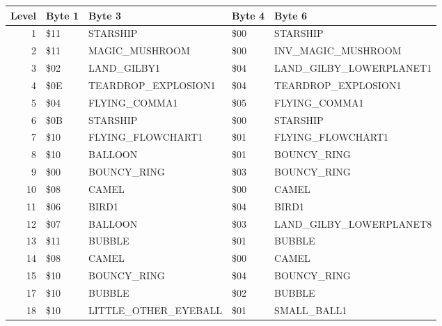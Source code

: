 \begin{figure}[H]
  {
  \setlength{\tabcolsep}{3.0pt}
  \setlength\cmidrulewidth{\heavyrulewidth} %
  \begin{adjustbox}{width=\textwidth}

\begin{tabular}{rllll}
\toprule
   Level & Byte 1    & Byte 3               & Byte 4    & Byte 6                  \\
\midrule
       1 & \$11       & STARSHIP             & \$00       & STARSHIP                \\
       2 & \$11       & MAGIC\_MUSHROOM       & \$00       & INV\_MAGIC\_MUSHROOM      \\
       3 & \$02       & LAND\_GILBY1          & \$04       & LAND\_GILBY\_LOWERPLANET1 \\
       4 & \$0E       & TEARDROP\_EXPLOSION1  & \$04       & TEARDROP\_EXPLOSION1     \\
       5 & \$04       & FLYING\_COMMA1        & \$05       & FLYING\_COMMA1           \\
       6 & \$0B       & STARSHIP             & \$00       & STARSHIP                \\
       7 & \$10       & FLYING\_FLOWCHART1    & \$01       & FLYING\_FLOWCHART1       \\
       8 & \$10       & BALLOON              & \$01       & BOUNCY\_RING             \\
       9 & \$00       & BOUNCY\_RING          & \$03       & BOUNCY\_RING             \\
      10 & \$08       & CAMEL                & \$00       & CAMEL                   \\
      11 & \$06       & BIRD1                & \$04       & BIRD1                   \\
      12 & \$07       & BALLOON              & \$03       & LAND\_GILBY\_LOWERPLANET8 \\
      13 & \$11       & BUBBLE               & \$01       & BUBBLE                  \\
      14 & \$08       & CAMEL                & \$00       & CAMEL                   \\
      15 & \$10       & BOUNCY\_RING          & \$04       & BOUNCY\_RING             \\
      17 & \$10       & BUBBLE               & \$02       & BUBBLE                  \\
      18 & \$10       & LITTLE\_OTHER\_EYEBALL & \$01       & SMALL\_BALL1             \\

\end{tabular}
\end{adjustbox}}
\end{figure}
